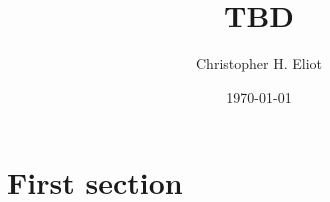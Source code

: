 \documentclass[11pt]{article}
\title{TBD}
\author{Christopher H. Eliot}
\date{\today}
\begin{document}
\maketitle

\section*{First section}



\RaggedRight \sloppy
\printbibliography
\end{document}
